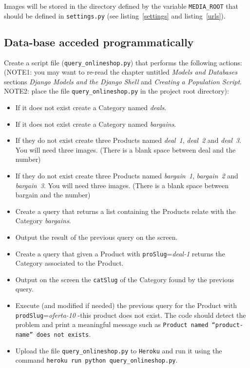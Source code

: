 \documentclass[12pt]{article} %
\newcommand{\ttt}[1]{\texttt{#1}}%
\newcommand{\settings}{\texttt{settings.py}}%
\newcommand{\heroku}{\texttt{Heroku}}
\begin{document}
Images will be stored in the directory defined by the variable \ttt{MEDIA\_ROOT} that should be defined in \settings{} (see listing~\ref{settings} and listing~\ref{urls}).

\subsection{Data-base acceded programmatically}

Create a script file (\texttt{query\_onlineshop.py}) that performs the following actions:
(NOTE1: you may want to re-read the chapter untitled \textit{Models and Databases} sections \textit{Django Models and the Django Shell} and \textit{Creating a Population Script}. NOTE2: place the file \texttt{query\_onlineshop.py} in the project root directory):

\begin{itemize}
    \item If it does not exist create a Category named \textit{deals}. 
    \item If it does not exist create a Category named \textit{bargains}. 
    \item If they do not exist create three Products named \textit{deal~1}, \textit{deal~2} and \textit{deal~3}. You will need three images. (There is a blank space between deal and the number) 
    \item If they do not exist create three Products named \textit{bargain~1}, \textit{bargain~2} and \textit{bargain~3}. You will need three images. (There is a blank space between bargain and the number) 
    \item Create a query that returns a list containing the Products relate with the Category  \textit{bargains}.
    \item Output  the result of the previous query  on the screen.
    \item Create a query that given a Product with \texttt{proSlug}=\textit{deal-1} returns the Category associated to the Product.
    \item Output on the screen the \texttt{catSlug} of the Category found by the previous query.
    \item Execute (and modified if needed) the previous query for the Product with \ttt{prodSlug}=\textit{oferta-10} -this product does not exist. The code should detect the problem and print a meaningful message such as \texttt{Product named ``product-name'' does not exists}.
    \item Upload the file \texttt{query\_onlineshop.py} to \heroku{} and run it using the command \texttt{heroku run python query\_onlineshop.py}.
\end{itemize}
\end{document}
